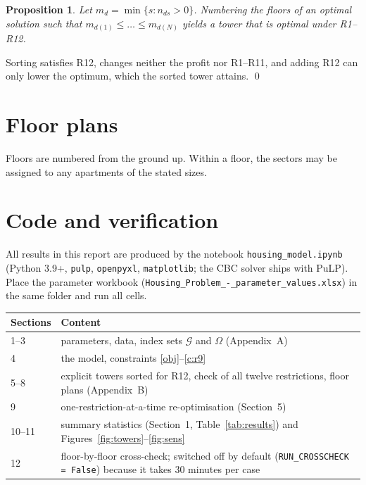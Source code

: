 \documentclass[11pt,a4paper]{article}
\newtheorem{proposition}{Proposition}
\newcommand{\Gset}{\mathcal{G}}
\begin{document}
\begin{proposition}\label{prop:r12}
Let $m_d=\min\{s:n_{ds}>0\}$. Numbering the floors of an optimal solution such
that $m_{d(1)}\le\dots\le m_{d(N)}$ yields a tower that is optimal under R1--R12.
\end{proposition}
Sorting satisfies R12, changes neither the profit nor R1--R11, and adding R12 can
only lower the optimum, which the sorted tower attains. \qed

\section{Floor plans}
Floors are numbered from the ground up. Within a floor, the sectors may be
assigned to any apartments of the stated sizes.

\small

\normalsize

\section{Code and verification}

{\sloppy All results in this report are produced by the notebook \texttt{housing\_model.ipynb}
(Python 3.9+, \texttt{pulp}, \texttt{openpyxl}, \texttt{matplotlib}; the CBC solver ships with PuLP).
Place the parameter workbook (\texttt{Housing\_Problem\_-\_\allowbreak parameter\_values.xlsx}) in the same folder and run all cells.\par}

\begin{tabularx}{\textwidth}{@{}l X@{}}
\toprule
Sections & Content \\
\midrule
1--3 & parameters, data, index sets $\Gset$ and $\Omega$ (Appendix~A) \\
4 & the model, constraints \eqref{obj}--\eqref{c:r9} \\
5--8 & explicit towers sorted for R12, check of all twelve restrictions, floor plans (Appendix~B) \\
9 & one-restriction-at-a-time re-optimisation (Section~5) \\
10--11 & summary statistics (Section~1, Table~\ref{tab:results}) and Figures~\ref{fig:towers}--\ref{fig:sens} \\
12 & floor-by-floor cross-check; switched off by default (\texttt{RUN\_CROSSCHECK = False}) because it takes 30 minutes per case \\
\bottomrule
\end{tabularx}
\end{document}

